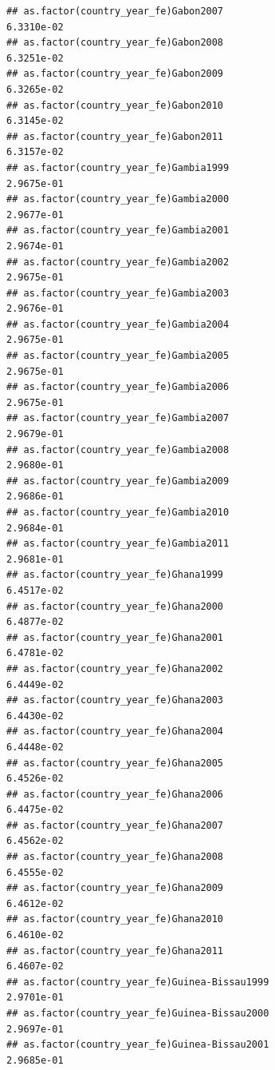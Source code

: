 \documentclass[
  a4paper,
]{article}
\begin{document}
\begin{verbatim}
## as.factor(country_year_fe)Gabon2007                             6.3310e-02
## as.factor(country_year_fe)Gabon2008                             6.3251e-02
## as.factor(country_year_fe)Gabon2009                             6.3265e-02
## as.factor(country_year_fe)Gabon2010                             6.3145e-02
## as.factor(country_year_fe)Gabon2011                             6.3157e-02
## as.factor(country_year_fe)Gambia1999                            2.9675e-01
## as.factor(country_year_fe)Gambia2000                            2.9677e-01
## as.factor(country_year_fe)Gambia2001                            2.9674e-01
## as.factor(country_year_fe)Gambia2002                            2.9675e-01
## as.factor(country_year_fe)Gambia2003                            2.9676e-01
## as.factor(country_year_fe)Gambia2004                            2.9675e-01
## as.factor(country_year_fe)Gambia2005                            2.9675e-01
## as.factor(country_year_fe)Gambia2006                            2.9675e-01
## as.factor(country_year_fe)Gambia2007                            2.9679e-01
## as.factor(country_year_fe)Gambia2008                            2.9680e-01
## as.factor(country_year_fe)Gambia2009                            2.9686e-01
## as.factor(country_year_fe)Gambia2010                            2.9684e-01
## as.factor(country_year_fe)Gambia2011                            2.9681e-01
## as.factor(country_year_fe)Ghana1999                             6.4517e-02
## as.factor(country_year_fe)Ghana2000                             6.4877e-02
## as.factor(country_year_fe)Ghana2001                             6.4781e-02
## as.factor(country_year_fe)Ghana2002                             6.4449e-02
## as.factor(country_year_fe)Ghana2003                             6.4430e-02
## as.factor(country_year_fe)Ghana2004                             6.4448e-02
## as.factor(country_year_fe)Ghana2005                             6.4526e-02
## as.factor(country_year_fe)Ghana2006                             6.4475e-02
## as.factor(country_year_fe)Ghana2007                             6.4562e-02
## as.factor(country_year_fe)Ghana2008                             6.4555e-02
## as.factor(country_year_fe)Ghana2009                             6.4612e-02
## as.factor(country_year_fe)Ghana2010                             6.4610e-02
## as.factor(country_year_fe)Ghana2011                             6.4607e-02
## as.factor(country_year_fe)Guinea-Bissau1999                     2.9701e-01
## as.factor(country_year_fe)Guinea-Bissau2000                     2.9697e-01
## as.factor(country_year_fe)Guinea-Bissau2001                     2.9685e-01

\end{verbatim}
\end{document}
